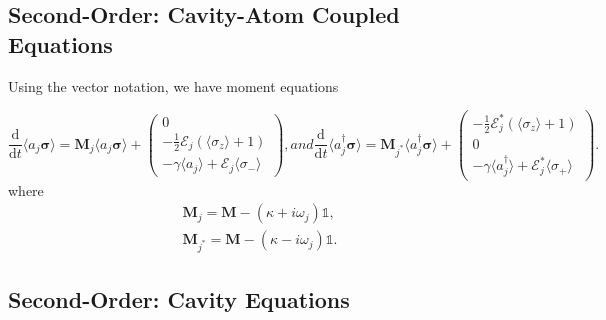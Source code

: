 \documentclass{article}
\newcommand{\ddt}[1][]{\frac{\mathrm{d} #1}{\mathrm{d}t}}
\begin{document}
\subsection{Second-Order: Cavity-Atom Coupled Equations}

Using the vector notation, we have moment equations

\begin{subequations}
	\begin{equation}
		\ddt \langle a_{j} \bm{\sigma} \rangle = \bm{M}_{j} \langle a_{j} \bm{\sigma} \rangle +
		\begin{pmatrix}
			0 \\
			-\frac{1}{2} \mathcal{E}_{j} \left( \langle \sigma_{z} \rangle + 1 \right) \\
			-\gamma \langle a_{j} \rangle + \mathcal{E}_{j} \langle \sigma_{-} \rangle
		\end{pmatrix},
	\end{equation}
	and
	\begin{equation}
		\ddt \langle a^{\dagger}_{j} \bm{\sigma} \rangle = \bm{M}_{j^{*}} \langle a^{\dagger}_{j} \bm{\sigma} \rangle +
		\begin{pmatrix}
			-\frac{1}{2} \mathcal{E}_{j}^{*} \left( \langle \sigma_{z} \rangle + 1 \right) \\
			0 \\
			-\gamma \langle a^{\dagger}_{j} \rangle + \mathcal{E}_{j}^{*} \langle \sigma_{+} \rangle
		\end{pmatrix}.
	\end{equation}
\end{subequations}
where
\begin{subequations}
	\begin{gather}
		\bm{M}_{j} = \bm{M} - \left( \kappa + i \omega_{j} \right) \mathbb{1}, \\
		 \bm{M}_{j^{*}} = \bm{M} - \left( \kappa - i \omega_{j} \right) \mathbb{1}.
	\end{gather}
\end{subequations}

\subsection{Second-Order: Cavity Equations}
\end{document}
